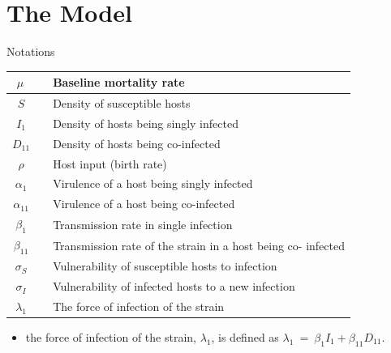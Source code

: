 \documentclass{beamer}
\begin{document}
	\section{The Model}
	\begin{frame}{Notations}
		\begin{table}
		\begin{tabular}{c l}
			\hline
			$\mu$\ \  & Baseline mortality rate \\
			\hline
			$S$\ \  & Density of susceptible hosts \\
			\hline
			$I_1$\ \ & Density of hosts being singly infected\\
			\hline
			$D_{11}$\ \ & Density of hosts being co-infected\\
			\hline
			$\rho$\ \ & Host input (birth rate)\\
			\hline
			$\alpha_1$\ \ & Virulence of a host being singly infected\\
			\hline
			$\alpha_{11}$\ \ & Virulence of a host being co-infected\\
			\hline
			$\beta_1$\ \ & Transmission rate in single infection\\
			\hline
			$\beta_{11}$\ \ & Transmission rate of the strain in a host being co- infected\\
			\hline
			$\sigma_S$\ \ & Vulnerability of susceptible hosts to infection\\
			\hline
			$\sigma_I$\ \ & Vulnerability of infected hosts to a new infection\\
			\hline
			$\lambda_1$\ \ & The force of infection of the strain\\
		\end{tabular}
		\end{table}
		\begin{itemize}
			\item the force of infection of the strain, $\lambda_1$, is defined as $\lambda_1\ =\ \beta_1I_1 + \beta_{11}D_{11}$.
		\end{itemize}
	\end{frame}
\end{document}
